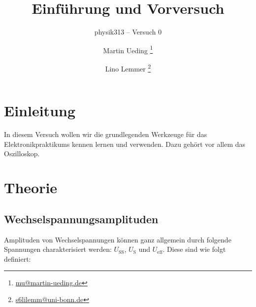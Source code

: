 




\subject{Praktikumsprotokoll}
\title{Einführung und Vorversuch}
\subtitle{physik313 – Versuch 0}
\author{
	Martin Ueding \footnote{\href{mailto:mu@martin-ueding.de}{mu@martin-ueding.de}}
	\and
	Lino Lemmer \footnote{\href{mailto:s6lilemm@uni-bonn.de}{s6lilemm@uni-bonn.de}}
}
\publishers{Gruppe 3 -- A -- Brezina}



\maketitle

\tableofcontents
\newpage


\section{Einleitung}

In diesem Versuch wollen wir die grundlegenden Werkzeuge für das
Elektronikpraktikums kennen lernen und verwenden. Dazu gehört vor allem das
Oszilloskop.


\section{Theorie}

\subsection{Wechselspannungsamplituden}

Amplituden von Wechselspannungen können ganz allgemein durch folgende
Spannungen charakterisiert werden: $U_\text{SS}$, $U_\text{S}$ und
$U_\text{eff}$. Diese sind wie folgt definiert:

